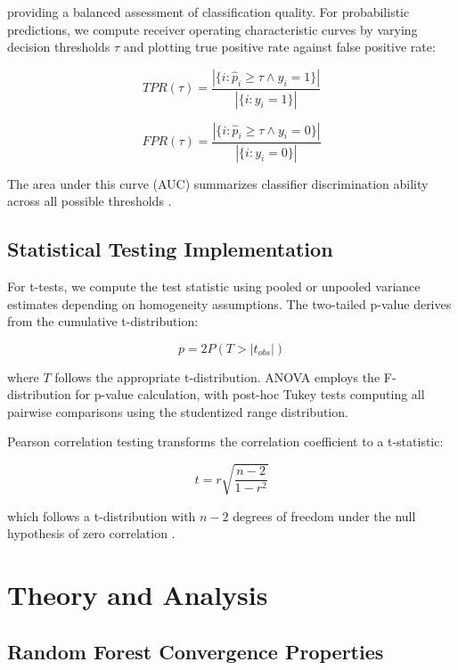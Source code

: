 \documentclass[conference]{IEEEtran}
\begin{document}
providing a balanced assessment of classification quality. For probabilistic predictions, we compute receiver operating characteristic curves by varying decision thresholds $\tau$ and plotting true positive rate against false positive rate:

\begin{equation}
TPR(\tau) = \frac{|\{i: \hat{p}_i \geq \tau \land y_i = 1\}|}{|\{i: y_i = 1\}|}
\end{equation}

\begin{equation}
FPR(\tau) = \frac{|\{i: \hat{p}_i \geq \tau \land y_i = 0\}|}{|\{i: y_i = 0\}|}
\end{equation}

The area under this curve (AUC) summarizes classifier discrimination ability across all possible thresholds \cite{hanley1982meaning}.

\subsection{Statistical Testing Implementation}

For t-tests, we compute the test statistic using pooled or unpooled variance estimates depending on homogeneity assumptions. The two-tailed p-value derives from the cumulative t-distribution:

\begin{equation}
p = 2P(T > |t_{obs}|)
\end{equation}

where $T$ follows the appropriate t-distribution. ANOVA employs the F-distribution for p-value calculation, with post-hoc Tukey tests computing all pairwise comparisons using the studentized range distribution.

Pearson correlation testing transforms the correlation coefficient to a t-statistic:

\begin{equation}
t = r\sqrt{\frac{n-2}{1-r^2}}
\end{equation}

which follows a t-distribution with $n-2$ degrees of freedom under the null hypothesis of zero correlation \cite{student1908probable}.

\section{Theory and Analysis}

\subsection{Random Forest Convergence Properties}
\end{document}
